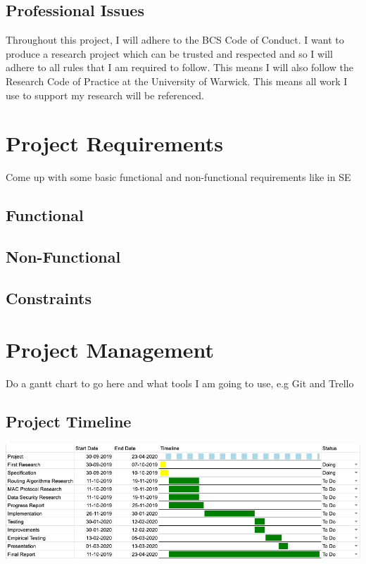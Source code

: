 \documentclass{report}
\begin{document}
\section*{Professional Issues}

Throughout this project, I will adhere to the BCS Code of Conduct\cite{BCSCoP}. I want to produce a 
research project which can be trusted and respected and so I will adhere to all rules that I am required 
to follow. This means I will also follow the Research Code of Practice at the University of Warwick\cite{UniWarwickCOP}. 
This means all work I use to support my research will be referenced. 

\chapter*{Project Requirements}

Come up with some basic functional and non-functional requirements like in SE

\section*{Functional}

\section*{Non-Functional}

\section*{Constraints}

\chapter*{Project Management}

Do a gantt chart to go here and what tools I am going to use, e.g Git and Trello
\section*{Project Timeline}

\includegraphics[scale=0.35]{ProjectTimeline}
\end{document}
